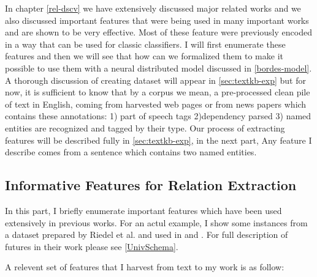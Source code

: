 In chapter \ref{rel-dscv} we have extensively discussed major related works and
we also discussed important features that were being used in many important
works and are shown to be very effective. Most of these feature were previously
encoded in a way that can be used for classic classifiers. I will first
enumerate these features and then we will see that how can we formalized them
to make it possible to use them with a neural distributed model discussed in
\ref{bordes-model}. A thorough discussion of creating dataset will appear in
\ref{sec:textkb-exp} but for now, it is sufficient to know that by a corpus we
mean, a pre-processed clean pile of text in English, coming from harvested web
pages or from news papers which contains these annotations: 1) part of speech
tags 2)dependency parsed 3) named entities are recognized and tagged by their
type. Our process of extracting features will be described fully in
\ref{sec:textkb-exp}, in the next part, Any feature I describe comes from a
sentence which contains two named entities. 

\subsection{Informative Features for Relation Extraction}
In this part, I briefly enumerate important features which have been used
extensively in previous works. For an actul example, I show some instances from
a dataset prepared by Riedel et al. and used in \cite{Riedel2013} and
\cite{Riedel2010a}. For full description of futures in their work please see
\ref{UnivSchema}.

A relevent set of features that I harvest from text to my work is as follow:

